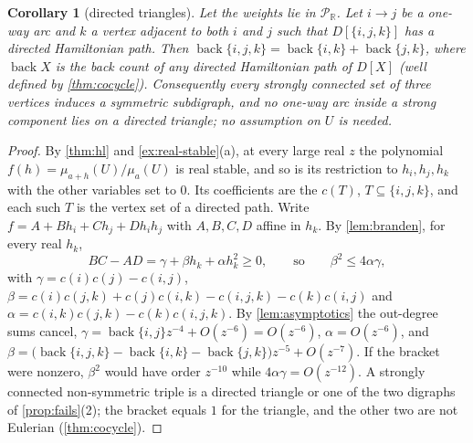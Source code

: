 \documentclass[11pt]{amsart}
\theoremstyle{plain}
\newtheorem{corollary}[theorem]{Corollary}
\theoremstyle{definition}
\theoremstyle{remark}
\numberwithin{equation}{section}
\newcommand{\RR}{\mathbb{R}}
\newcommand{\Puis}{\mathcal{P}_{\RR}}
\newcommand{\back}{\operatorname{back}}
\begin{document}
\begin{corollary}[directed triangles]\label{cor:triangles}
Let the weights lie in $\Puis$. Let $i\to j$ be a one-way arc and $k$ a vertex adjacent to both $i$ and $j$ such that $D[\{i,j,k\}]$ has a directed Hamiltonian path. Then $\back\{i,j,k\}=\back\{i,k\}+\back\{j,k\}$, where $\back X$ is the back count of any directed Hamiltonian path of $D[X]$ \textup{(}well defined by \cref{thm:cocycle}\textup{)}. Consequently every strongly connected set of three vertices induces a symmetric subdigraph, and no one-way arc inside a strong component lies on a directed triangle; no assumption on $U$ is needed.
\end{corollary}
\begin{proof}
By \cref{thm:hl} and \cref{ex:real-stable}(a), at every large real $z$ the polynomial $f(h)=\mu_{a+h}(U)/\mu_a(U)$ is real stable, and so is its restriction to $h_i,h_j,h_k$ with the other variables set to $0$. Its coefficients are the $c(T)$, $T\subseteq\{i,j,k\}$, and each such $T$ is the vertex set of a directed path. Write $f=A+Bh_i+Ch_j+Dh_ih_j$ with $A,B,C,D$ affine in $h_k$. By \cref{lem:branden}, for every real $h_k$,
\[
BC-AD=\gamma+\beta h_k+\alpha h_k^{2}\ge0,\qquad\text{so}\qquad \beta^{2}\le4\alpha\gamma,
\]
with $\gamma=c(i)c(j)-c(i,j)$, $\beta=c(i)c(j,k)+c(j)c(i,k)-c(i,j,k)-c(k)c(i,j)$ and $\alpha=c(i,k)c(j,k)-c(k)c(i,j,k)$. By \cref{lem:asymptotics} the out-degree sums cancel, $\gamma=\back\{i,j\}z^{-4}+O(z^{-6})=O(z^{-6})$, $\alpha=O(z^{-6})$, and $\beta=\bigl(\back\{i,j,k\}-\back\{i,k\}-\back\{j,k\}\bigr)z^{-5}+O(z^{-7})$. If the bracket were nonzero, $\beta^2$ would have order $z^{-10}$ while $4\alpha\gamma=O(z^{-12})$. A strongly connected non-symmetric triple is a directed triangle or one of the two digraphs of \cref{prop:fails}(2); the bracket equals $1$ for the triangle, and the other two are not Eulerian (\cref{thm:cocycle}).
\end{proof}
\end{document}
